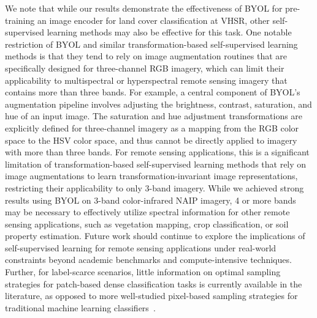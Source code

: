 We note that while our results demonstrate the effectiveness of BYOL for pre-training an image encoder for land cover classification at VHSR, other self-supervised learning methods may also be effective for this task.
One notable restriction of BYOL and similar transformation-based self-supervised learning methods is that they tend to rely on image augmentation routines that are specifically designed for three-channel RGB imagery, which can limit their applicability to multispectral or hyperspectral remote sensing imagery that contains more than three bands.
For example, a central component of BYOL's augmentation pipeline involves adjusting the brightness, contrast, saturation, and hue of an input image.
The saturation and hue adjustment transformations are explicitly defined for three-channel imagery as a mapping from the RGB color space to the HSV color space, and thus cannot be directly applied to imagery with more than three bands.
For remote sensing applications, this is a significant limitation of transformation-based self-supervised learning methods that rely on image augmentations to learn transformation-invariant image representations, restricting their applicability to only 3-band imagery.
While we achieved strong results using BYOL on 3-band color-infrared NAIP imagery, 4 or more bands may be necessary to effectively utilize spectral information for other remote sensing applications, such as vegetation mapping, crop classification, or soil property estimation.
Future work should continue to explore the implications of self-supervised learning for remote sensing applications under real-world constraints beyond academic benchmarks and compute-intensive techniques.
Further, for label-scarce scenarios, little information on optimal sampling strategies for patch-based dense classification tasks is currently available in the literature, as opposed to more well-studied pixel-based sampling strategies for traditional machine learning classifiers~\citep{stehmanImpactSampleSize2012, zhuOptimizingSelectionTraining2016, brownLessonsLearnedImplementing2020}.

